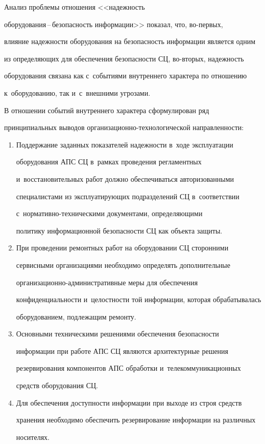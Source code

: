   Анализ проблемы отношения <<надежность  

обо\-ру\-до\-ва\-ния\,--\,безопас\-ность информации>> показал, что, во-пер\-вых, 

влияние надежности оборудования на безопасность информации является одним 

из определяющих для обеспечения безопас\-ности СЦ, во-вто\-рых, надежность 

оборудования связана как с~событиями внут\-рен\-не\-го характера по отношению 

к~оборудованию, так и~с~внеш\-ни\-ми угрозами. 

  

  В отношении событий внутреннего характера сформулирован ряд 

принципиальных выводов ор\-га\-ни\-за\-ци\-он\-но-тех\-но\-ло\-ги\-че\-ской на\-прав\-лен\-ности:

  \begin{enumerate}[1.]

\item Поддержание заданных показателей надежности в~ходе эксплуатации 

оборудования АПС СЦ в~рамках проведения регламентных 

и~восстановительных работ должно обеспечиваться авторизованными 

специалистами из эксплуатирующих подразделений СЦ в~соответствии  

с~нор\-ма\-тив\-но-тех\-ни\-че\-ски\-ми документами, определяющими 

политику информационной безопасности СЦ как объекта защиты.

\item При проведении ремонтных работ на оборудовании СЦ сторонними 

сервисными организациями необходимо определять дополнительные  

ор\-га\-ни\-за\-ци\-он\-но-ад\-ми\-нист\-ра\-тив\-ные меры для обеспечения 

конфиденциальности и~целостности той информации, которая обрабатывалась 

оборудованием, подлежащим ремонту.

\item Основными техническими решениями обеспечения безопасности 

информации при работе АПС СЦ являются архитектурные решения 

резервирования компонентов АПС обработки и~телекоммуникационных 

средств оборудования СЦ.

\item Для обеспечения доступности информации при выходе из строя средств 

хранения необходимо обеспечить резервирование информации на различных 

носителях.

\end{enumerate}



